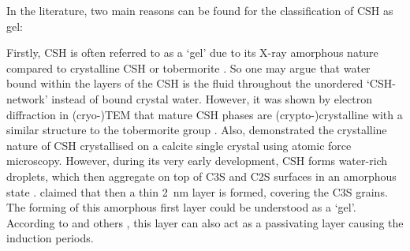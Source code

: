 In the literature, two main reasons can be found for the classification of \ac{CSH} as gel:

Firstly, \ac{CSH} is often referred to as a `gel' due to its X-ray amorphous nature compared to crystalline \ac{CSH} or tobermorite \cite{jennings.1981, garbev.2004}.
So one may argue that water bound within the layers of the \ac{CSH} is the fluid throughout the unordered `\ac{CSH}-network' instead of bound crystal water.
However, it was shown by electron diffraction in (cryo-)\ac{TEM} that mature \ac{CSH} phases are (crypto-)crystalline \cite{kurczyk.1960, grudemo.1960, grudemo.1965, melzer.1989, rossler.2006} with a similar structure to the tobermorite group \cite{grudemo.1960,kurczyk.1960,biagioni.2015}.
Also, \textcite{nonat.2004} demonstrated the crystalline nature of \ac{CSH} crystallised on a calcite single crystal using atomic force microscopy.
However, during its very early development, \ac{CSH} forms water-rich droplets, which then aggregate on top of \ac{C3S} and \ac{C2S} surfaces in an amorphous state \cite{sowoidnich.2023}.
\textcite{bellmann.2012} claimed that then a thin \qty{2}{\nano\meter} layer is formed, covering the \ac{C3S} grains.
The forming of this amorphous first layer could be understood as a `gel'.
According to \textcite{jennings.1986a} and others \cite{bellmann.2015, naber.2019}, this layer can also act as a passivating layer causing the induction periods.




